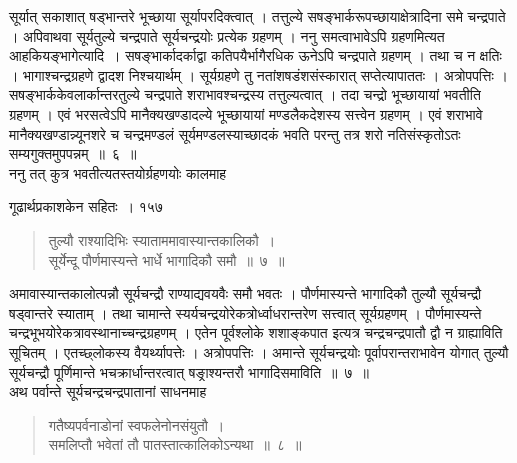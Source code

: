 \documentclass[11pt, openany]{book}
\begin{document}
\begin{sloppypar}
सूर्यात् सकाशात् षड्भान्तरे भूच्छाया सूर्यापरदिक्त्वात् । तत्तुल्ये सषङ्भार्करूपच्छायाक्षेत्रादिना समे चन्द्रपाते । अपिवाथवा सूर्यतुल्ये चन्द्रपाते सूर्यचन्द्रयोः प्रत्येक ग्रहणम् । ननु समत्वाभावेऽपि ग्रहणमित्यत आह\textendash  कियङ्भागेत्यादि~। सषङ्भार्कादर्काद्वा कतिपयैर्भागैरधिक ऊनेऽपि चन्द्रपाते ग्रहणम् । तथा च न क्षतिः । भागाश्चन्द्रग्रहणे द्वादश निश्चयार्थम् । सूर्यग्रहणे तु नतांशषडंशसंस्कारात् सप्तेत्यापाततः । अत्रोपपत्तिः । सषङ्भार्ककेवलार्कान्तरतुल्ये चन्द्रपाते शराभावश्चन्द्रस्य तत्तुल्यत्वात् । तदा चन्द्रो भूच्छायायां भवतीति ग्रहणम् । एवं भरसत्वेऽपि मानैक्यखण्डादल्ये भूच्छायायां मण्डलैकदेशस्य सत्त्वेन ग्रहणम् । एवं शराभावे मानैक्यखण्डान्न्यूनशरे च चन्द्रमण्डलं सूर्यमण्डलस्याच्छादकं भवति परन्तु तत्र शरो नतिसंस्कृतोऽतः सम्यगुक्तमुपपन्नम्~॥~६~॥\\
\noindent ननु तत् कुत्र भवतीत्यतस्तयोर्ग्रहणयोः कालमाह\textendash
\end{sloppypar}


\newpage

\hspace{3cm} गूढार्थप्रकाशकेन सहितः~। \hfill १५७
\vspace{1cm}


\begin{quote}
  {\ssi तुल्यौ राश्यादिभिः स्याताममावास्यान्तकालिकौ~।\\
 सूर्येन्दू पौर्णमास्यन्ते भार्धे भागादिकौ समौ~॥~७~॥}
 \end{quote}

\begin{sloppypar}
 अमावास्यान्तकालोत्पन्नौ सूर्यचन्द्रौ राण्याद्यवयवैः समौ भवतः । पौर्णमास्यन्ते भागादिकौ तुल्यौ सूर्यचन्द्रौ षड्वान्तरे स्याताम् । तथा चामान्ते स्यर्यचन्द्रयोरेकत्रोर्ध्वाधरान्तरेण सत्त्वात् सूर्यग्रहणम् । पौर्णमास्यन्ते चन्द्रभूभयोरेकत्रावस्थानाच्चन्द्रग्रहणम् । एतेन पूर्वश्लोके शशाङ्कपात इत्यत्र चन्द्रचन्द्रपातौ द्वौ न ग्राह्याविति सूचितम् । एतच्छ्लोकस्य वैयर्थ्यापत्तेः । अत्रोपपत्तिः । अमान्ते सूर्यचन्द्रयोः पूर्वापरान्तराभावेन योगात् तुल्यौ सूर्यचन्द्रौ पूर्णिमान्ते भचक्रार्धान्तरत्वात् षङ्राश्यन्तरौ भागादिसमाविति~॥~७~॥\\
 \noindent अथ पर्वान्ते सूर्यचन्द्रचन्द्रपातानां साधनमाह \textendash
\end{sloppypar}


\begin{quote}
  {\ssi गतैष्यपर्वनाडोनां स्वफलेनोनसंयुतौ~।\\
समलिप्तौ भवेतां तौ पातस्तात्कालिकोऽन्यथा~॥~८~॥}
\end{quote}
\end{document}
